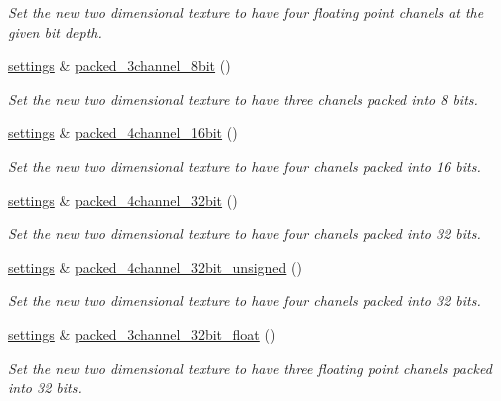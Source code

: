 \begin{DoxyCompactItemize}
\begin{DoxyCompactList}\small\item\em Set the new two dimensional texture to have four floating point chanels at the given bit depth. \end{DoxyCompactList}\item 
\hyperlink{classgfx_1_1texture__2D_1_1settings}{settings} \& \hyperlink{classgfx_1_1texture__2D_1_1settings_ae8fe9e6dfcad91121a3a745e45897527}{packed\-\_\-3channel\-\_\-8bit} ()
\begin{DoxyCompactList}\small\item\em Set the new two dimensional texture to have three chanels packed into 8 bits. \end{DoxyCompactList}\item 
\hyperlink{classgfx_1_1texture__2D_1_1settings}{settings} \& \hyperlink{classgfx_1_1texture__2D_1_1settings_aa977b49d28cc1e0c097fd19e43afa114}{packed\-\_\-4channel\-\_\-16bit} ()
\begin{DoxyCompactList}\small\item\em Set the new two dimensional texture to have four chanels packed into 16 bits. \end{DoxyCompactList}\item 
\hyperlink{classgfx_1_1texture__2D_1_1settings}{settings} \& \hyperlink{classgfx_1_1texture__2D_1_1settings_aba68094d2beb1f062371786ec0954597}{packed\-\_\-4channel\-\_\-32bit} ()
\begin{DoxyCompactList}\small\item\em Set the new two dimensional texture to have four chanels packed into 32 bits. \end{DoxyCompactList}\item 
\hyperlink{classgfx_1_1texture__2D_1_1settings}{settings} \& \hyperlink{classgfx_1_1texture__2D_1_1settings_ad44e3ff3231de217d09dbb8f519e52ba}{packed\-\_\-4channel\-\_\-32bit\-\_\-unsigned} ()
\begin{DoxyCompactList}\small\item\em Set the new two dimensional texture to have four chanels packed into 32 bits. \end{DoxyCompactList}\item 
\hyperlink{classgfx_1_1texture__2D_1_1settings}{settings} \& \hyperlink{classgfx_1_1texture__2D_1_1settings_ab865ee8e08d3bdb68249f5e3fa18b8a9}{packed\-\_\-3channel\-\_\-32bit\-\_\-float} ()
\begin{DoxyCompactList}\small\item\em Set the new two dimensional texture to have three floating point chanels packed into 32 bits. \end{DoxyCompactList}\item 

\end{DoxyCompactItemize}
